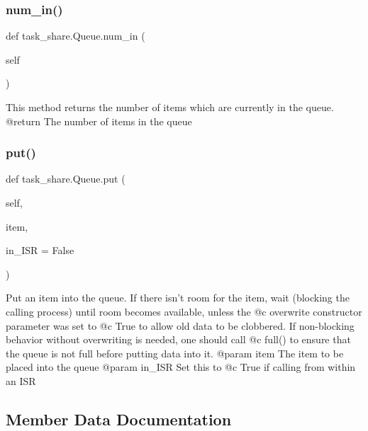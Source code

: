 \subsubsection{\texorpdfstring{num\_in()}{num\_in()}}
{\footnotesize\ttfamily def task\+\_\+share.\+Queue.\+num\+\_\+in (\begin{DoxyParamCaption}\item[{}]{self }\end{DoxyParamCaption})}

\begin{DoxyVerb}This method returns the number of items which are currently in the 
queue.
@return The number of items in the queue \end{DoxyVerb}
 \mbox{\label{classtask__share_1_1_queue_ae785bdf9d397d61729c22656471a81df}} 
\subsubsection{\texorpdfstring{put()}{put()}}
{\footnotesize\ttfamily def task\+\_\+share.\+Queue.\+put (\begin{DoxyParamCaption}\item[{}]{self,  }\item[{}]{item,  }\item[{}]{in\+\_\+\+I\+SR = {\ttfamily False} }\end{DoxyParamCaption})}

\begin{DoxyVerb}Put an item into the queue. If there isn't room for the item, wait 
(blocking the calling process) until room becomes available,
unless the @c overwrite constructor parameter was set to @c True to 
allow old data to be clobbered. If non-blocking behavior without
overwriting is needed, one should call @c full() to ensure that the 
queue is not full before putting data into it.
@param item The item to be placed into the queue
@param in_ISR Set this to @c True if calling from within an ISR \end{DoxyVerb}
 

\subsection{Member Data Documentation}
\mbox{\label{classtask__share_1_1_queue_a6f9d87b116eb16dba0867d3746af9f5f}} 
